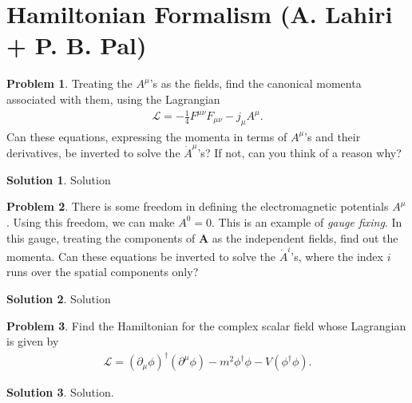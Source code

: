 \documentclass{book}
\numberwithin{equation}{section}
\theoremstyle{definition}
\newtheorem{prob}{Problem}[section]
\newtheorem{sln}{Solution}[section]
\newcommand{\p}{\partial}
\newcommand{\lag}{\mathcal{L}}
\begin{document}
\newpage


\section{Hamiltonian Formalism (A. Lahiri + P. B. Pal)}

\begin{prob}
	Treating the $A^\mu$'s as the fields, find the canonical momenta associated with them, using the Lagrangian 
	\begin{align}
	\lag = -\frac{1}{4}F^{\mu\nu}F_{\mu\nu} - j_\mu A^\mu.
	\end{align}
	Can these equations, expressing the momenta in terms of $A^\mu$'s and their derivatives, be inverted to solve the $\dot{A}^\mu$'s? If not, can you think of a reason why?\\
	
	\begin{sln}
		Solution
	\end{sln}
\end{prob}


\newpage




\begin{prob}
	There is some freedom in defining the electromagnetic potentials $A^\mu$. Using this freedom, we can make $A^0 = 0$. This is an example of \textit{gauge fixing}. In this gauge, treating the components of $\textbf{A}$ as the independent fields, find out the momenta. Can these equations be inverted to solve the $\dot{A}^i$'s, where the index $i$ runs over the spatial components only?\\
	
	\begin{sln}
		Solution
	\end{sln}
\end{prob}


\newpage



\begin{prob}
	Find the Hamiltonian for the complex scalar field whose Lagrangian is given by
	\begin{align}
	\lag = (\p_\mu\phi)^\dagger(\p^\mu\phi) - m^2\phi^\dagger\phi - V(\phi^\dagger\phi).
	\end{align}
	
	
	\begin{sln}
		Solution.
	\end{sln}
\end{prob}

\newpage
\end{document}
